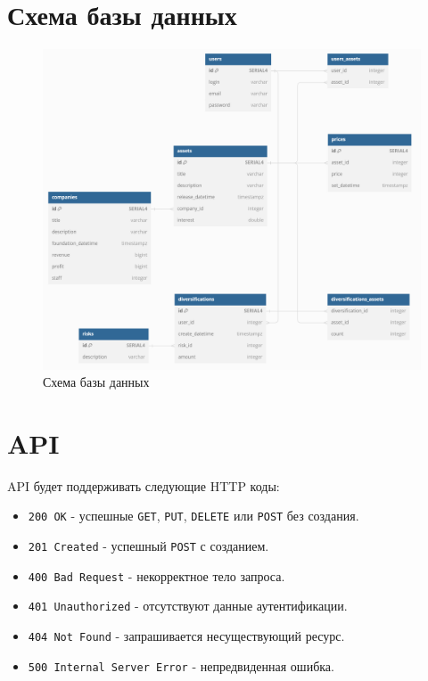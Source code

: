 \documentclass[a4paper, 14pt]{article}
\begin{document}
\section{Схема базы данных}


\begin{figure}[H]
    \centering
    \includegraphics[width=17cm]{resources/14.png}
    \caption{Схема базы данных}
\end{figure}

\section{API}

API будет поддерживать следующие HTTP коды:
\begin{itemize}
    \item \texttt{200 OK} - успешные \texttt{GET}, \texttt{PUT}, \texttt{DELETE} или \texttt{POST} без создания.
    \item \texttt{201 Created} - успешный \texttt{POST} с созданием.
    \item \texttt{400 Bad Request} - некорректное тело запроса.
    \item \texttt{401 Unauthorized} - отсутствуют данные аутентификации.
    \item \texttt{404 Not Found} - запрашивается несуществующий ресурс.
    \item \texttt{500 Internal Server Error} - непредвиденная ошибка.
\end{itemize}
\end{document}
